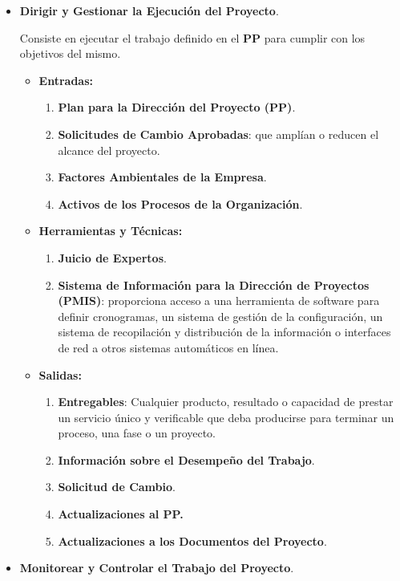 \documentclass[10pt,a4paper]{article}
\begin{document}
\begin{itemize}
\item \textbf{Dirigir y Gestionar la Ejecución del Proyecto}.

Consiste en ejecutar el trabajo definido en el \textbf{PP} para cumplir con los objetivos del mismo.

\begin{itemize}
\item \textbf{Entradas:}
\begin{enumerate}
\item \textbf{Plan para la Dirección del Proyecto (PP)}.
\item \textbf{Solicitudes de Cambio Aprobadas}: que amplían o reducen el alcance del proyecto.
\item \textbf{Factores Ambientales de la Empresa}.
\item \textbf{Activos de los Procesos de la Organización}.
\end{enumerate}

\item \textbf{Herramientas y Técnicas:}
\begin{enumerate}
\item \textbf{Juicio de Expertos}.
\item \textbf{Sistema de Información para la Dirección de Proyectos (PMIS)}: proporciona acceso a una herramienta de software para definir cronogramas, un sistema de gestión de la configuración, un sistema de recopilación y distribución de la información o interfaces de red a otros sistemas automáticos en línea.
\end{enumerate}

\item \textbf{Salidas:}
\begin{enumerate}
\item \textbf{Entregables}: Cualquier producto, resultado o capacidad de prestar un servicio único y verificable que deba producirse para terminar un proceso, una fase o un proyecto.
\item \textbf{Información sobre el Desempeño del Trabajo}.
\item \textbf{Solicitud de Cambio}.
\item \textbf{Actualizaciones al PP.}
\item \textbf{Actualizaciones a los Documentos del Proyecto}.
\end{enumerate}
\end{itemize}

\item \textbf{Monitorear y Controlar el Trabajo del Proyecto}.


\end{itemize}
\end{document}
